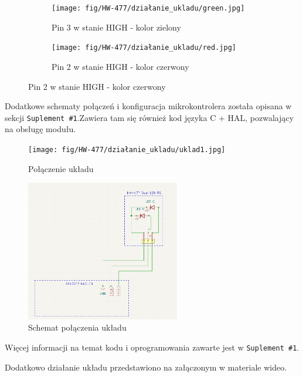\documentclass[11pt, a4paper]{article}
\begin{document}
\vspace{0.25cm}
\begin{figure}[h]
\centering
\begin{subfigure}{.5\textwidth}
\centering
\texttt{[image: fig/HW-477/działanie\_ukladu/green.jpg]}
\caption{Pin 3 w stanie HIGH - kolor zielony}
\label{fig:_uklad_woltomierz_otw}
\end{subfigure}%
\begin{subfigure}{.5\textwidth}
\centering
\texttt{[image: fig/HW-477/działanie\_ukladu/red.jpg]}
\caption{Pin 2 w stanie HIGH - kolor czerwony}
\label{fig:_uklad_woltomierz_zmk}
\end{subfigure}
\label{fig:woltomierz}
\end{figure}
\vspace{0.25cm}

Dodatkowe schematy połączeń i konfiguracja
mikrokontrolera została opisana w sekcji \texttt{Suplement \#1}.Zawiera tam się również kod języka
C + HAL, pozwalający na obsługę modułu.

\newpage
\begin{figure}[h]
    \centering
    \texttt{[image: fig/HW-477/działanie\_ukladu/uklad1.jpg]}
    \caption{Połączenie układu}
    \label{fig:polaczenie_ukladu}
\end{figure}

\begin{figure}[h]
    \centering
    \includegraphics[width=0.6\textwidth]{fig/HW-477/polaczenie_modulu/hw-477_schemat2.PNG}
    \caption{Schemat połączenia układu}
    \label{fig:schemat_polaczenie_ukladu}
\end{figure}


Więcej informacji na temat kodu i oprogramowania zawarte jest w \texttt{Suplement \#1}.


Dodatkowo działanie układu przedstawiono na załączonym w \texttt{\cite{yt}} materiale 
wideo.

\newpage
\printbibliography[heading=bibintoc]
\end{document}
